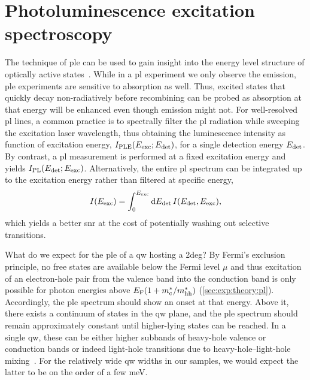 \section{Photoluminescence excitation spectroscopy}\label{sec:exp:observations:ple}
The technique of \acrfull{ple} can be used to gain insight into the energy level structure of optically active states~\cite{Gilliland1997}.
While in a \gls{pl} experiment we only observe the emission, \gls{ple} experiments are sensitive to absorption as well.
Thus, excited states that quickly decay non-radiatively before recombining can be probed as absorption at that energy will be enhanced even though emission might not.
For well-resolved \gls{pl} lines, a common practice is to spectrally filter the \gls{pl} radiation while sweeping the excitation laser wavelength, thus obtaining the luminescence intensity as function of excitation energy, $I_{\mathrm{PLE}}(E_{\mathrm{exc}}; E_{\mathrm{det}})$, for a single detection energy $E_{\mathrm{det}}$.
By contrast, a \gls{pl} measurement is performed at a fixed excitation energy and yields $I_{\mathrm{PL}}(E_{\mathrm{det}}; E_{\mathrm{exc}})$.
Alternatively, the entire \gls{pl} spectrum can be integrated up to the excitation energy rather than filtered at specific energy,
\begin{equation}\label{eq:exp:ple}
    I(E_{\mathrm{exc}}) = \int_{0}^{E_{\mathrm{exc}}}\dd{E_{\ensuremath{\mathrm{det}}}} I(E_{\mathrm{det}}, E_{\mathrm{exc}}),
\end{equation}
which yields a better \gls{snr} at the cost of potentially washing out selective transitions.

What do we expect for the \gls{ple} of a \gls{qw} hosting a \gls{2deg}?
By Fermi's exclusion principle, no free states are available below the Fermi level $\mu$ and thus excitation of an electron-hole pair from the valence band into the conduction band is only possible for photon energies above $E_{\mathrm{F}}(1 + m_{\mathrm{c}}^\ast/m_{\mathrm{hh}}^\ast)$ (\cref{sec:exp:theory:pl}).
Accordingly, the \gls{ple} spectrum should show an onset at that energy.
Above it, there exists a continuum of states in the \gls{qw} plane, and the \gls{ple} spectrum should remain approximately constant until higher-lying states can be reached.
In a single \gls{qw}, these can be either higher subbands of heavy-hole valence or conduction bands or indeed light-hole transitions due to heavy-hole--light-hole mixing~\cite{Bastard1984,Miller1985b,Laruelle1988,Reynolds1988,ElKhalifi1989}.
For the relatively wide \gls{qw} widths in our samples, we would expect the latter to be on the order of a few \unit{\milli\electronvolt}.

